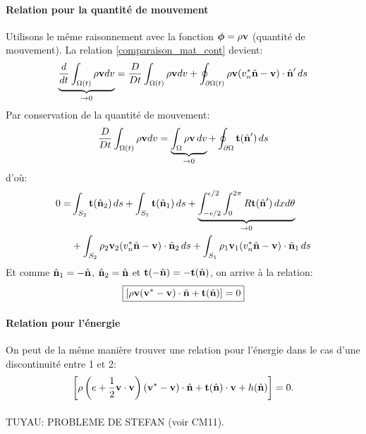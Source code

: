 \paragraph{Relation pour la quantité de mouvement}
Utilisons le même raisonnement avec la fonction $\boldsymbol{\phi}=\rho\textbf{v}$ (quantité de mouvement). La relation \ref{comparaison_mat_cont} devient:
$$\underbrace{\frac{d}{dt}\int_{\Omega (t)}\rho\textbf{v} dv}_{\rightarrow 0}=\frac{D}{Dt}\int_{\Omega (t)}\rho\textbf{v} dv+\oint_{\partial \Omega (t)}\rho\textbf{v}(v_n^*\hat{\textbf{n}}-\textbf{v})\cdot \hat{\textbf{n}}'\,ds$$
Par conservation de la quantité de mouvement:
$$\frac{D}{Dt}\int_{\Omega (t)}\rho\textbf{v} dv = \underbrace{\int_{\Omega}\rho\textbf{v}\,dv}_{\rightarrow 0}+\oint_{\partial\Omega}\textbf{t}(\hat{\textbf{n}}')\,ds$$
d'où:
\begin{align*}
0=&\int_{S_2}\textbf{t}(\hat{\textbf{n}}_2)\,ds + \int_{S_1}\textbf{t}(\hat{\textbf{n}}_1)\,ds + \underbrace{\int_{-\epsilon/2}^{\epsilon/2}\int_0^{2\pi}R\textbf{t} (\hat{\textbf{n}}')\,dxd\theta}_{\rightarrow 0}\\
 &+\int_{S_2}\rho_2\textbf{v}_2(v_n^*\hat{\textbf{n}}-\textbf{v})\cdot\hat{\textbf{n}}_2\,ds + \int_{S_1}\rho_1\textbf{v}_1(v_n^*\hat{\textbf{n}}-\textbf{v})\cdot\hat{\textbf{n}}_1\,ds
\end{align*}
Et comme $\hat{\textbf{n}}_1=-\hat{\textbf{n}}$, $\hat{\textbf{n}}_2=\hat{\textbf{n}}$ et $\textbf{t}(-\hat{\textbf{n}})=-\textbf{t}(\hat{\textbf{n}})$, on arrive à la relation:
$$\boxed{[\rho\textbf{v}(\textbf{v}^*-\textbf{v})\cdot\hat{\textbf{n}}+\textbf{t}(\hat{\textbf{n}})]=0}$$

\paragraph{Relation pour l'énergie}
On peut de la même manière trouver une relation pour l'énergie dans le cas d'une discontinuité entre 1 et 2:
$$\left[\rho\left(e+\frac{1}{2}\textbf{v}\cdot\textbf{v}\right)(\textbf{v}^*-\textbf{v})\cdot\hat{\textbf{n}}+\textbf{t}(\hat{\textbf{n}})\cdot\textbf{v}+h(\hat{\textbf{n}})\right]=0.$$
\paragraph{}
\vspace{3cm}
TUYAU: PROBLEME DE STEFAN (voir CM11).


